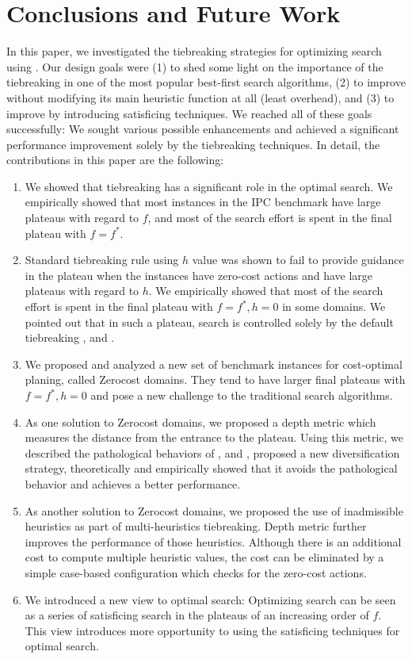
\section{Conclusions and Future Work}

In this paper, we investigated the tiebreaking strategies for optimizing search using \astar.  Our design goals
were (1) to shed some light on the importance of the tiebreaking in one of the most popular best-first search
algorithms, (2) to improve \astar without modifying its main heuristic function at all (least overhead), and (3) to
improve \astar by introducing satisficing techniques. We reached all of these goals successfully: We sought
various possible enhancements and achieved a significant performance improvement solely by the tiebreaking
techniques. In detail, the contributions in this paper are the following:

\begin{enumerate}
 \item We showed that tiebreaking has a significant role in the optimal
       search. We empirically showed that most instances in the IPC
       benchmark have large plateaus with regard to $f$, and most of the
       search effort is spent in the final plateau with $f=f^*$.
 \item Standard tiebreaking rule using $h$ value was shown to fail to
       provide guidance in the plateau when the instances have zero-cost
       actions and have large plateaus with regard to $h$.
       We empirically showed that most of the search effort is spent in
       the final plateau with $f=f^*, h=0$ in some domains. We pointed out that in such
       a plateau, search is controlled solely by the
       default tiebreaking \fifo, \lifo and \ro.
 \item We proposed and analyzed a new set of benchmark instances for cost-optimal planing, called Zerocost domains.
       They tend to have larger final plateaus with $f=f^*, h=0$ and pose a new challenge to the traditional search
       algorithms.
 \item As one solution to Zerocost domains, we proposed a depth metric
       which measures the distance from the entrance to the
       plateau. Using this metric, we described the pathological
       behaviors of \fifo, \lifo and \ro, proposed a new diversification
       strategy, theoretically and empirically showed that it avoids the
       pathological behavior and achieves a better performance.
 \item As another solution to Zerocost domains, we proposed the use of
       inadmissible heuristics as part of multi-heuristics tiebreaking.
       Depth metric further improves the performance of those
       heuristics. Although there is an additional cost to compute
       multiple heuristic values, the cost can be eliminated by a simple
       case-based configuration which checks for the zero-cost actions.
 \item We introduced a new view to optimal \astar search: Optimizing search can be seen as a series of satisficing
       search in the plateaus of an increasing order of $f$. This view introduces more opportunity to using the
       satisficing techniques for optimal search.
\end{enumerate}

